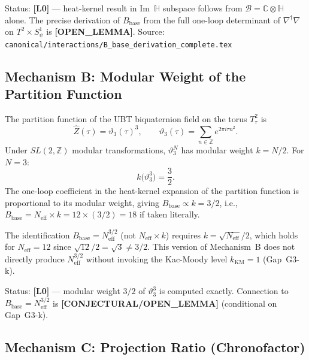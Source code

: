 \documentclass[12pt,a4paper]{article}
\theoremstyle{definition}
\theoremstyle{remark}
\begin{document}
\begin{resultbox}
Status: \textbf{[L0]} — heat-kernel result in Im~$\mathbb{H}$ subspace follows from
$\mathcal{B} = \mathbb{C}\otimes\mathbb{H}$ alone.  The precise derivation of
$B_\mathrm{base}$ from the full one-loop determinant of $\nabla^\dagger\nabla$ on
$T^2\times S^1_\psi$ is \textbf{[OPEN\_LEMMA]}.
Source: \texttt{canonical/interactions/B\_base\_derivation\_complete.tex}
\end{resultbox}

\subsection{Mechanism B: Modular Weight of the Partition Function}
\label{sec:g5:modular}

The partition function of the UBT biquaternion field on the torus $T^2_\tau$ is
\begin{equation}
  \hat{Z}(\tau) = \vartheta_3(\tau)^3, \qquad
  \vartheta_3(\tau) = \sum_{n\in\mathbb{Z}} e^{2\pi i\tau n^2}.
  \label{eq:g5:Zhat}
\end{equation}
Under $SL(2,\mathbb{Z})$ modular transformations, $\vartheta_3^N$ has modular weight
$k = N/2$.  For $N = 3$:
\begin{equation}
  k\bigl(\vartheta_3^3\bigr) = \frac{3}{2}.
  \label{eq:g5:k_modular}
\end{equation}
The one-loop coefficient in the heat-kernel expansion of the partition function is
proportional to its modular weight, giving $B_\mathrm{base} \propto k = 3/2$, i.e.,
$B_\mathrm{base} = N_\mathrm{eff} \times k = 12 \times (3/2) = 18$ if taken literally.

The identification $B_\mathrm{base} = N_\mathrm{eff}^{3/2}$ (not $N_\mathrm{eff} \times k$)
requires $k = \sqrt{N_\mathrm{eff}}/2$, which holds for $N_\mathrm{eff} = 12$ since
$\sqrt{12}/2 = \sqrt{3} \ne 3/2$.  This version of Mechanism~B does not directly
produce $N_\mathrm{eff}^{3/2}$ without invoking the Kac-Moody level $k_\mathrm{KM} = 1$
(Gap~G3-k).

\begin{statusbox}
Status: \textbf{[L0]} — modular weight $3/2$ of $\vartheta_3^3$ is computed exactly.
Connection to $B_\mathrm{base} = N_\mathrm{eff}^{3/2}$ is \textbf{[CONJECTURAL/OPEN\_LEMMA]}
(conditional on Gap~G3-k).
\end{statusbox}

\subsection{Mechanism C: Projection Ratio (Chronofactor)}
\label{sec:g5:proj}
\end{document}
